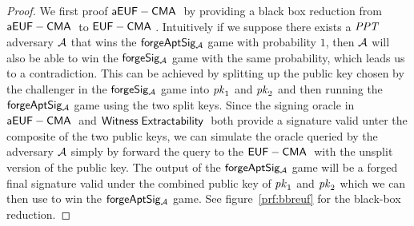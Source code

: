 \begin{proof} We first proof $\mathsf{aEUF-CMA\;}$ by providing a black box reduction from $\mathsf{aEUF-CMA\;}$ to $\mathsf{EUF-CMA\;}$.
Intuitively if we suppose there exists a $\mathit{PPT}$ adversary $\mathcal{A}$ that wins the $\mathsf{forgeAptSig_{\mathcal{A}}}$ game with probability $1$,
then $\mathcal{A}$ will also be able to win the $\mathsf{forgeSig_{\mathcal{A}}}$ game with the same probability, which leads us to a contradiction.
This can be achieved by splitting up the public key chosen by the challenger in the $\mathsf{forgeSig_{\mathcal{A}}}$ game into $\mathit{pk}_1$ and $\mathit{pk}_2$ and then running the
$\mathsf{forgeAptSig_{\mathcal{A}}}$ game using the two split keys.
Since the signing oracle in $\mathsf{aEUF-CMA\;}$ and $\mathsf{Witness\;Extractability\;}$ both provide a signature valid unter the composite of the two public keys, we can simulate the oracle
queried by the adversary $\mathcal{A}$ simply by forward the query to the $\mathsf{EUF-CMA\;}$ with the unsplit version of the public key.
The output of the $\mathsf{forgeAptSig_{\mathcal{A}}}$ game will be a forged final signature valid under the combined public key of $\mathit{pk}_1$ and $\mathit{pk}_2$
which we can then use to win the $\mathsf{forgeAptSig_{\mathcal{A}}}$ game. See figure~\ref{prf:bbreuf} for the black-box reduction.


\end{proof}
